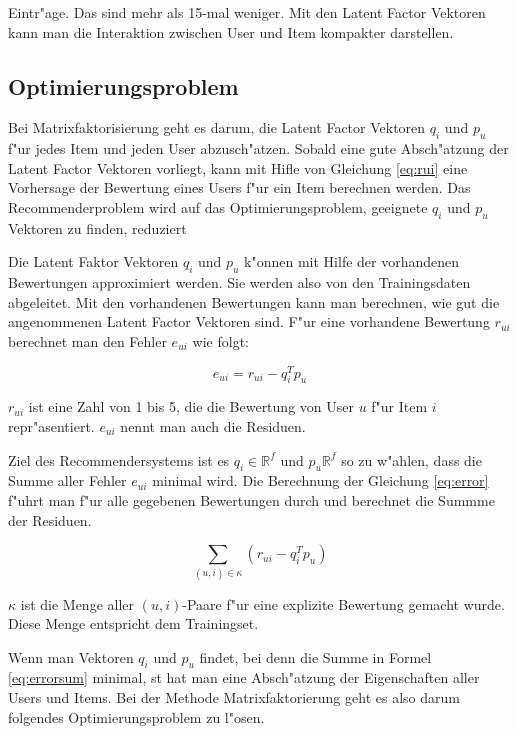 \documentclass[a4paper, 12pt]{article}
\begin{document}
Eintr"age. Das sind mehr als 15-mal weniger. Mit den Latent Factor Vektoren kann man die Interaktion zwischen User und Item kompakter darstellen.

\subsection{Optimierungsproblem}
\label{sec:optim}

Bei Matrixfaktorisierung geht es darum, die Latent Factor Vektoren $q_i$ und $p_u$ f"ur jedes Item und jeden User abzusch"atzen. Sobald eine gute Absch"atzung der Latent Factor Vektoren vorliegt, kann mit Hifle von Gleichung \ref{eq:rui} eine Vorhersage der Bewertung eines Users f"ur ein Item berechnen werden. Das Recommenderproblem wird auf das Optimierungsproblem, geeignete  $q_i$ und $p_u$ Vektoren zu finden, reduziert

Die Latent Faktor Vektoren $q_i$ und $p_u$ k"onnen mit Hilfe der vorhandenen Bewertungen approximiert werden. Sie werden also von den Trainingsdaten abgeleitet. Mit den vorhandenen Bewertungen kann man berechnen, wie gut die angenommenen Latent Factor Vektoren sind. F"ur eine vorhandene Bewertung $r_{ui}$ berechnet man den Fehler $e_{ui}$ wie folgt:

\begin{equation}
  \label{eq:error}
  e_{ui} = r_{ui} - q_i^T p_u
\end{equation}

$r_{ui}$ ist eine Zahl von 1 bis 5, die die Bewertung von User $u$ f"ur Item $i$ repr"asentiert. $e_{ui}$ nennt man auch die Residuen.

Ziel des Recommendersystems ist es $q_i \in \mathbb{R}^f$ und $p_u \mathbb{R}^f$ so zu w"ahlen, dass die Summe aller Fehler $e_{ui}$ minimal wird. Die Berechnung der Gleichung \ref{eq:error} f"uhrt man f"ur alle gegebenen Bewertungen durch und berechnet die Summme der Residuen.

\begin{equation}
\label{eq:errorsum}
  \sum_{(u,i) \in \kappa} (r_{ui} - q_i^T p_u)
\end{equation}

$\kappa$ ist die Menge aller $(u,i)$-Paare f"ur eine explizite Bewertung gemacht wurde. Diese Menge entspricht dem Trainingset.

Wenn man Vektoren $q_i$ und $p_u$ findet, bei denn die Summe in Formel \ref{eq:errorsum} minimal, st hat man eine Absch"atzung der Eigenschaften aller Users und Items. Bei der Methode Matrixfaktorierung geht es also darum folgendes Optimierungsproblem zu l"osen.
\end{document}
